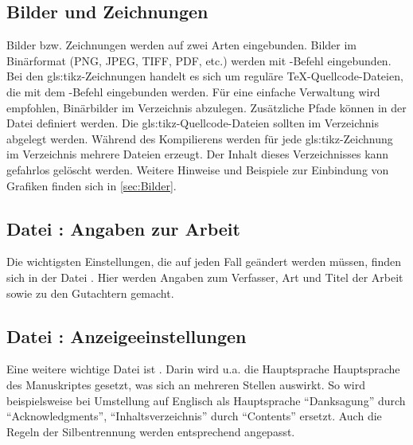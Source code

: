 \subsection[Bilder und Zeichnungen]{Bilder und Zeichnungen}%
%
%
\label{sec:BilderUndZeichnungen}
%
Bilder bzw. Zeichnungen werden auf zwei Arten eingebunden.
Bilder im Binärformat (PNG, JPEG, TIFF, PDF, etc.)
werden mit -Befehl eingebunden. 
Bei den \gls{gls:tikz}-Zeichnungen handelt es sich um reguläre TeX-Quellcode-Dateien,
die mit dem \verb++-Befehl eingebunden werden.
Für eine einfache Verwaltung wird empfohlen, Binärbilder im Verzeichnis  abzulegen.
Zusätzliche Pfade können in der Datei  definiert werden.
Die \gls{gls:tikz}-Quellcode-Dateien sollten im Verzeichnis  abgelegt werden.
Während des Kompilierens werden für jede \gls{gls:tikz}-Zeichnung im Verzeichnis  mehrere Dateien erzeugt.
Der Inhalt dieses Verzeichnisses kann gefahrlos gelöscht werden.
Weitere Hinweise und Beispiele zur Einbindung von Grafiken finden sich in \cref{sec:Bilder}.

\subsection[Datei \printfilepath{AlleAngaben.tex}: Angaben zur Arbeit]{Datei : Angaben zur Arbeit}%
%
%
\label{sec:Angaben}
%
Die wichtigsten Einstellungen, die auf jeden Fall geändert werden müssen,
finden sich in der Datei .
Hier werden \ua Angaben zum Verfasser, Art und Titel der Arbeit sowie zu den Gutachtern gemacht.

\subsection[Datei \printfilepath{AlleSchalter.tex}: Anzeigeeinstellungen]{Datei : Anzeigeeinstellungen}%
%
\label{sec:Schalter}
%
Eine weitere wichtige Datei ist .
Darin wird u.a. die Hauptsprache Hauptsprache des Manuskriptes gesetzt, was sich an mehreren Stellen auswirkt.
So wird beispielsweise bei Umstellung auf Englisch als Hauptsprache
\enquote{Danksagung} durch \enquote{Acknowledgments},
\enquote{Inhaltsverzeichnis} durch \enquote{Contents}
\usw ersetzt.
Auch die Regeln der Silbentrennung werden entsprechend angepasst.

